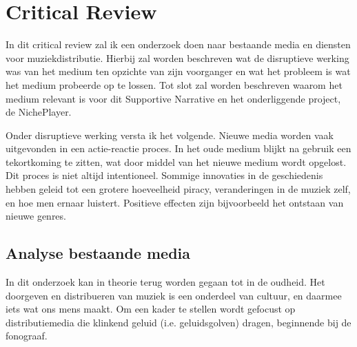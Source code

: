 \section{Critical Review}
\captionsetup[figure]{font=small,labelfont=bf}


In dit critical review zal ik een onderzoek doen naar bestaande media en diensten voor muziekdistributie. Hierbij zal worden beschreven wat de disruptieve werking was van het medium ten opzichte van zijn voorganger en wat het probleem is wat het medium probeerde op te lossen. Tot slot zal worden beschreven waarom het medium relevant is voor dit Supportive Narrative en het onderliggende project, de NichePlayer.

Onder disruptieve werking versta ik het volgende. Nieuwe media worden vaak uitgevonden in een actie-reactie proces. In het oude medium blijkt na gebruik een tekortkoming te zitten, wat door middel van het nieuwe medium wordt opgelost. Dit proces is niet altijd intentioneel. Sommige innovaties in de geschiedenis hebben geleid tot een grotere hoeveelheid piracy, veranderingen in de muziek zelf, en hoe men ernaar luistert. Positieve effecten zijn bijvoorbeeld het ontstaan van nieuwe genres.

\subsection{Analyse bestaande media}
In dit onderzoek kan in theorie terug worden gegaan tot in de oudheid. Het doorgeven en distribueren van muziek is een onderdeel van cultuur, en daarmee iets wat ons mens maakt. Om een kader te stellen wordt gefocust op distributiemedia die klinkend geluid (i.e. geluidsgolven) dragen, beginnende bij de fonograaf.

